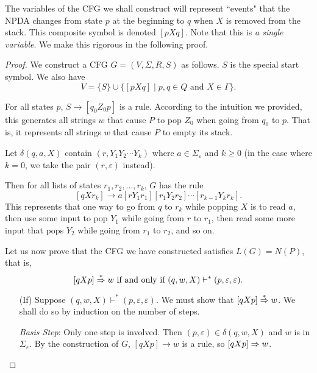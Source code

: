 The variables of the CFG we shall construct will represent ``events" that the NPDA changes from state $p$ at the beginning to $q$ when $X$ is removed from the stack. This composite symbol is denoted $[pXq]$. Note that this is \textit{a single variable}. We make this rigorous in the following proof.

\begin{proof}
    We construct a CFG $G=(V,\Sigma,R,S)$ as follows. $S$ is the special start symbol. We also have
    $$V=\{S\}\cup \{[pXq]\mid p,q\in Q\text{ and }X\in\Gamma\}.$$
    
    \vspace{1mm}
    For all states $p$, $S\to [q_0Z_0p]$ is a rule. According to the intuition we provided, this generates all strings $w$ that cause $P$ to pop $Z_0$ when going from $q_0$ to $p$. That is, it represents all strings $w$ that cause $P$ to empty its stack. 
    
    \vspace{1mm}
    Let $\delta(q,a,X)$ contain $(r,Y_1Y_2\cdots Y_k)$ where $a\in\Sigma_\varepsilon$ and $k\geq 0$ (in the case where $k=0$, we take the pair $(r,\varepsilon)$ instead).
    
    \vspace{1mm}
    Then for all lists of states $r_1,r_2,\ldots,r_k$, $G$ has the rule
    $$[qXr_k]\to a[rY_1r_1][r_1Y_2r_2]\cdots [r_{k-1}Y_kr_k].$$
    This represents that one way to go from $q$ to $r_k$ while popping $X$ is to read $a$, then use some input to pop $Y_1$ while going from $r$ to $r_1$, then read some more input that pops $Y_2$ while going from $r_1$ to $r_2$, and so on.
    
    \vspace{2mm}
    Let us now prove that the CFG we have constructed satisfies $L(G)=N(P)$, that is,
    $$[qXp]\overset{*}{\Rightarrow} w\text{ if and only if }(q,w,X)\vdash^*(p,\varepsilon,\varepsilon).$$
    
    \begin{itemize}
        \item[(If)]
        Suppose $(q,w,X)\vdash^* (p,\varepsilon,\varepsilon)$. We must show that $[qXp]\overset{*}{\Rightarrow} w$. We shall do so by induction on the number of steps.
        
        \vspace{2mm}
        \textit{Basis Step}: Only one step is involved. Then $(p,\varepsilon)\in\delta(q,w,X)$ and $w$ is in $\Sigma_\varepsilon$. By the construction of $G$, $[qXp]\to w$ is a rule, so $[qXp]\Rightarrow w$.
        

\end{itemize}
\end{proof}
